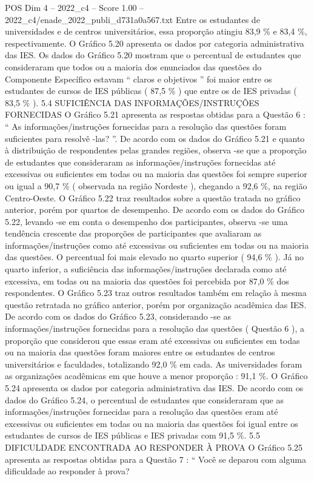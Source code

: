\begin{textsample}{POS Dim 4 – 2022\_c4 – Score 1.00 – 2022\_c4/enade\_2022\_publi\_d731a0a567.txt}
Entre os estudantes de universidades e de centros universitários, essa proporção atingiu 83,9 \% e 83,4 \%, respectivamente.
O Gráfico 5.20 apresenta os dados por categoria administrativa das IES.
Os dados do Gráfico 5.20 mostram que o percentual de estudantes que consideraram que todos ou a maioria dos enunciados das questões do Componente Específico estavam “ claros e objetivos ” foi maior entre os estudantes de cursos de IES públicas ( 87,5 \% ) que entre os de IES privadas ( 83,5 \% ). 5.4 SUFICIÊNCIA DAS INFORMAÇÕES/INSTRUÇÕES FORNECIDAS O Gráfico 5.21 apresenta as respostas obtidas para a Questão 6 : “ As informações/instruções fornecidas para a resolução das questões foram suficientes para resolvê -las? ”.
De acordo com os dados do Gráfico 5.21 e quanto à distribuição de respondentes pelas grandes regiões, observa -se que a proporção de estudantes que consideraram as informações/instruções fornecidas até excessivas ou suficientes em todas ou na maioria das questões foi sempre superior ou igual a 90,7 \% ( observada na região Nordeste ), chegando a 92,6 \%, na região Centro-Oeste.
O Gráfico 5.22 traz resultados sobre a questão tratada no gráfico anterior, porém por quartos de desempenho.
De acordo com os dados do Gráfico 5.22, levando -se em conta o desempenho dos participantes, observa -se uma tendência crescente das proporções de participantes que avaliaram as informações/instruções como até excessivas ou suficientes em todas ou na maioria das questões.
O percentual foi mais elevado no quarto superior ( 94,6 \% ).
Já no quarto inferior, a suficiência das informações/instruções declarada como até excessiva, em todas ou na maioria das questões foi percebida por 87,0 \% dos respondentes.
O Gráfico 5.23 traz outros resultados também em relação à mesma questão retratada no gráfico anterior, porém por organização acadêmica das IES.
De acordo com os dados do Gráfico 5.23, considerando -se as informações/instruções fornecidas para a resolução das questões ( Questão 6 ), a proporção que considerou que essas eram até excessivas ou suficientes em todas ou na maioria das questões foram maiores entre os estudantes de centros universitários e faculdades, totalizando 92,0 \% em cada.
As universidades foram as organizações acadêmicas em que houve a menor proporção : 91,1 \%.
O Gráfico 5.24 apresenta os dados por categoria administrativa das IES.
De acordo com os dados do Gráfico 5.24, o percentual de estudantes que consideraram que as informações/instruções fornecidas para a resolução das questões eram até excessivas ou suficientes em todas ou na maioria das questões foi igual entre os estudantes de cursos de IES públicas e IES privadas com 91,5 \%. 5.5 DIFICULDADE ENCONTRADA AO RESPONDER À PROVA O Gráfico 5.25 apresenta as respostas obtidas para a Questão 7 : “ Você se deparou com alguma dificuldade ao responder à prova?

\end{textsample}
